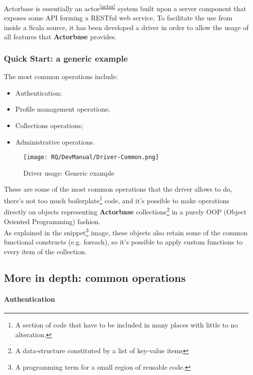 \documentclass{scalatekids-article}
\begin{document}
Actorbase is essentially an actor\textsuperscript{\ref{actor}} system built upon
a server component that exposes some API forming a RESTful web service. To
facilitate the use from inside a Scala source, it has been developed a driver in
order to allow the usage of all features that \textbf{Actorbase} provides.\\

\subsubsection{Quick Start: a generic example}

The most common operations include:
\begin{itemize}
\item Authentication;
\item Profile management operations;
\item Collections operations;
\item Administrative operations.
\end{itemize}

\begin{figure}[H]
  \begin{center}
    \texttt{[image: RQ/DevManual/Driver-Common.png]}
    \caption{Driver usage: Generic example}
  \end{center}
\end{figure}

These are some of the most common operations that the driver allows to do,
there's not too much boilerplate\footnote{A section of code that have to be
  included in many places with little to no alteration.} code, and it's possible
to make operations directly on objects representing \textbf{Actorbase}
collections\footnote{A data-structure constituted by a list of key-value items\label{coll}}
in a purely OOP (Object Oriented Programming) fashion.\\ As explained in
the snippet\footnote{A programming term for a small region of reusable code.}
image, these objects also retain some of the common functional constructs (e.g.
foreach), so it's possible to apply custom functions to every item of the
collection.

\subsection{More in depth: common operations}

\paragraph{Authentication}
\end{document}
